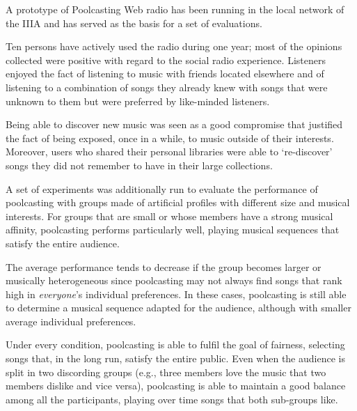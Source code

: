 A prototype of Poolcasting Web radio has been running in the local network of the IIIA and has served as the basis for a set of evaluations.

Ten persons have actively used the radio during one year; most of the opinions collected were positive with regard to the social radio experience.
Listeners enjoyed the fact of listening to music with friends located elsewhere and of listening to a combination of songs they already knew with songs that were unknown to them but were preferred by like-minded listeners.

Being able to discover new music was seen as a good compromise that justified the fact of being exposed, once in a while, to music outside of their interests.
Moreover, users who shared their personal libraries were able to `re-discover' songs they did not remember to have in their large collections.

A set of experiments was additionally run to evaluate the performance of poolcasting with groups made of artificial profiles with different size and musical interests.
For groups that are small or whose members have a strong musical affinity, poolcasting performs particularly well, playing musical sequences that satisfy the entire audience.

The average performance tends to decrease if the group becomes larger or musically heterogeneous since poolcasting may not always find songs that rank high in \emph{everyone}'s individual preferences. 
In these cases, poolcasting is still able to determine a musical sequence adapted for the audience, although with smaller average individual preferences.



Under every condition, poolcasting is able to fulfil the goal of fairness, selecting songs that, in the long run, satisfy the entire public.
Even when the audience is split in two discording groups (e.g., three members love the music that two members dislike and vice versa), poolcasting is able to maintain a good balance among all the participants, playing over time songs that both sub-groups like.

